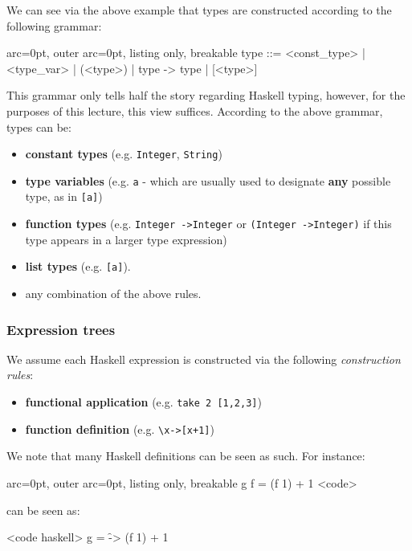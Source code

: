 We can see via the above example that types are constructed according to the following grammar:


\begin{tcblisting}{ arc=0pt, outer arc=0pt, listing only, breakable}
type ::= <const_type> | <type_var> | (<type>) | type -> type | [<type>]

\end{tcblisting}


This grammar only tells half the story regarding Haskell typing, however, for the purposes of this lecture, this view suffices. According to the above grammar, types can be:
\begin{itemize}
	\item  \textbf{constant types} (e.g. \texttt{Integer}, \texttt{String})
	\item  \textbf{type variables} (e.g. \texttt{a} - which are usually used to designate \textbf{any} possible type, as in \texttt{[a]})
	\item  \textbf{function types} (e.g. \texttt{Integer -\textgreater  Integer} or \texttt{(Integer -\textgreater  Integer)} if this type appears in a larger type expression)
	\item  \textbf{list types} (e.g. \texttt{[a]}).
	\item  any combination of the above rules.
\end{itemize}


\subsubsection*{ Expression trees }

We assume each Haskell expression is constructed via the following \textit{construction rules}:
\begin{itemize}
	\item  \textbf{functional application} (e.g. \texttt{take 2 [1,2,3]})
	\item  \textbf{function definition} (e.g. \texttt{\textbackslash x-\textgreater [x+1]})
\end{itemize}

We note that many Haskell definitions can be seen as such. For instance:

\begin{tcblisting}{ arc=0pt, outer arc=0pt, listing only, breakable}
g f = (f 1) + 1
<code>

can be seen as:

<code haskell>
g = \f -> (f 1) + 1

\end{tcblisting}


